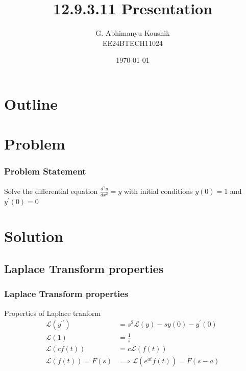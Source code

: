 \documentclass{beamer}
\title{12.9.3.11 Presentation}
\author{G. Abhimanyu Koushik \\ EE24BTECH11024}
\date{\today}
\providecommand{\brak}[1]{\ensuremath{\left(#1\right)}}
\theoremstyle{remark}
\numberwithin{equation}{section}
\begin{document}
\begin{frame}
\titlepage
\end{frame}

\section*{Outline}
\begin{frame}
\tableofcontents
\end{frame}
\section{Problem}
\begin{frame}
\frametitle{Problem Statement}
%
Solve the differential equation $\frac{d^2y}{dx^2} = y$ with initial conditions $y\brak{0} = 1$ and $y^{\prime}\brak{0} = 0$
%
\end{frame}

\section{Solution}
\subsection{Laplace Transform properties}
\begin{frame}
\frametitle{Laplace Transform properties}
Properties of Laplace tranform
\begin{align}
	\mathcal{L}\brak{y^{\prime\prime}} &= s^2\mathcal{L}\brak{y} -sy\brak{0}-y^\prime\brak{0}\\
	\mathcal{L}\brak{1} &= \frac{1}{s}\\
	\mathcal{L}\brak{cf\brak{t}} &= c\mathcal{L}\brak{f\brak{t}}\\
	\mathcal{L}\brak{f\brak{t}} = F\brak{s} &\implies \mathcal{L}\brak{e^{at}f\brak{t}} = F\brak{s-a}
\end{align}
\end{frame}
\end{document}
